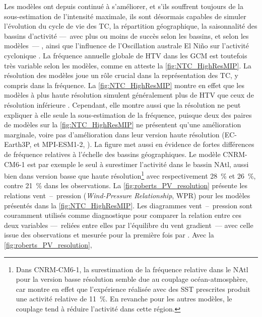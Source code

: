 \documentclass[../main.tex]{subfiles}
\begin{document}
Les modèles ont depuis continué à s'améliorer, et s'ils souffrent toujours de la sous-estimation de l'intensité maximale, ils sont désormais capables de simuler
l'évolution du cycle de vie des TC, la répartition géographique, la saisonnalité des bassins d'activité ---~avec plus ou moins de succès selon les bassins, et
selon les modèles~---
\parencite{bengtsson_tropical_2007,zhao_simulations_2009,shaevitz_characteristics_2014}, ainsi que l'influence de l'Oscillation australe El Niño sur l'activité cyclonique
\parencite{vitart_simulation_1997,gualdi_changes_2008,camargo_experimental_2009}. La fréquence annuelle globale de HTV dans les GCM est toutefois très variable
selon les modèles, comme en atteste la \cref{fig:NTC_HighResMIP}. La résolution des modèles joue un rôle crucial dans la représentation des TC, y compris dans
la fréquence. La \cref{fig:NTC_HighResMIP} montre en effet que les modèles à plus haute résolution simulent généralement plus de HTV que ceux de résolution
inférieure \parencite{camargo_global_2013,roberts_impact_2020}. Cependant, elle montre aussi que la résolution ne peut expliquer à elle seule la sous-estimation
de la fréquence, puisque deux des paires de modèles sur la \cref{fig:NTC_HighResMIP} ne présentent qu'une amélioration marginale, voire pas d'amélioration dans
leur version haute résolution (EC-Earth3P, \cite{haarsma_highresmip_2020} et MPI-ESM1-2, \cite{gutjahr_max_2019}). La figure met aussi en évidence de fortes
différences de fréquence relatives à l'échelle des bassins géographiques. Le modèle CNRM-CM6-1 est par exemple le seul à surestimer l'activité dans le bassin
NAtl, aussi bien dans version basse que haute résolution\footnote{Dans CNRM-CM6-1, la surestimation de la fréquence relative dans le NAtl pour la version basse
résolution semble due au couplage océan-atmosphère, car \cite{roberts_impact_2020,roberts_projected_2020} montre en effet que l'expérience réalisée avec des
SST prescrites produit une activité relative de \SI{11}{\percent}. En revanche pour les autres modèles, le couplage tend à réduire l'activité dans cette
région.} avec respectivement \SI{28}{\percent} et \SI{26}{\percent}, contre \SI{21}{\percent} dans les observations. La \cref{fig:roberts_PV_resolution}
présente les relations vent~--~pression (\textit{Wind-Pressure Relationship}, WPR) pour les modèles présentés dans la \cref{fig:NTC_HighResMIP}. Les diagrammes
vent~--~pression sont couramment utilisés comme diagnostique pour comparer la relation entre ces deux variables ---~reliées entre elles par l'équilibre du vent
gradient~--- avec celle issue des observations et mesurée pour la première fois par \cite{atkinson_tropical_1977}. Avec la \cref{fig:roberts_PV_resolution},
\end{document}
